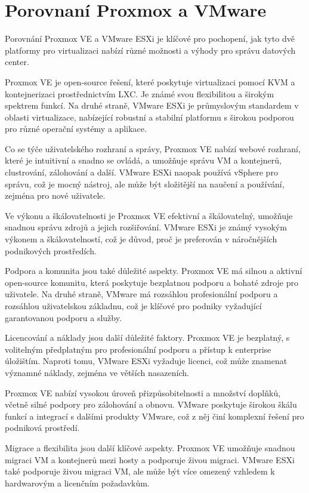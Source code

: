 \chapter{Porovnaní Proxmox a VMware}
Porovnání Proxmox VE a VMware ESXi je klíčové pro pochopení, jak tyto dvě platformy pro virtualizaci nabízí různé možnosti a výhody pro správu datových center.

Proxmox VE je open-source řešení, které poskytuje virtualizaci pomocí KVM a kontejnerizaci prostřednictvím LXC. Je známé svou flexibilitou a širokým spektrem funkcí. Na druhé straně, VMware ESXi je průmyslovým standardem v oblasti virtualizace, nabízející robustní a stabilní platformu s širokou podporou pro různé operační systémy a aplikace.

Co se týče uživatelského rozhraní a správy, Proxmox VE nabízí webové rozhraní, které je intuitivní a snadno se ovládá, a umožňuje správu VM a kontejnerů, clustrování, zálohování a další. VMware ESXi naopak používá vSphere pro správu, což je mocný nástroj, ale může být složitější na naučení a používání, zejména pro nové uživatele.

Ve výkonu a škálovatelnosti je Proxmox VE efektivní a škálovatelný, umožňuje snadnou správu zdrojů a jejich rozšiřování. VMware ESXi je známý vysokým výkonem a škálovatelností, což je důvod, proč je preferován v náročnějších podnikových prostředích.

Podpora a komunita jsou také důležité aspekty. Proxmox VE má silnou a aktivní open-source komunitu, která poskytuje bezplatnou podporu a bohaté zdroje pro uživatele. Na druhé straně, VMware má rozsáhlou profesionální podporu a rozsáhlou uživatelskou základnu, což je klíčové pro podniky vyžadující garantovanou podporu a služby.

Licencování a náklady jsou další důležité faktory. Proxmox VE je bezplatný, s volitelným předplatným pro profesionální podporu a přístup k enterprise úložištím. Naproti tomu, VMware ESXi vyžaduje licenci, což může znamenat významné náklady, zejména ve větších nasazeních.

Proxmox VE nabízí vysokou úroveň přizpůsobitelnosti a množství doplňků, včetně silné podpory pro zálohování a obnovu. VMware poskytuje širokou škálu funkcí a integrací s dalšími produkty VMware, což z něj činí komplexní řešení pro podniková prostředí.

Migrace a flexibilita jsou další klíčové aspekty. Proxmox VE umožňuje snadnou migraci VM a kontejnerů mezi hosty a podporuje živou migraci. VMware ESXi také podporuje živou migraci VM, ale může být více omezený vzhledem k hardwarovým a licenčním požadavkům.


